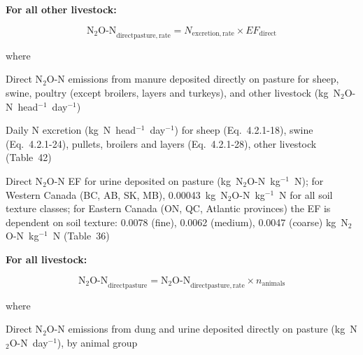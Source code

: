 \bigskip
\noindent\textbf{For all other livestock:}

\begin{equation}
    \mathrm{N_2O\text{-}N}_{\mathrm{directpasture,rate}}
        = N_{\mathrm{excretion,rate}} \times \mathit{EF}_{\mathrm{direct}}
    \tag{Eq.\ 5.3.1-2}
\end{equation}

\noindent where

\begin{description}[font=\normalfont, leftmargin=12em, style=nextline, nosep]
    \item[$\mathrm{N_2O\text{-}N}_{\mathrm{directpasture,rate}}$]
        Direct N$_2$O-N emissions from manure deposited directly on pasture for
        sheep, swine, poultry (except broilers, layers and turkeys), and other
        livestock (kg~N$_2$O-N~head$^{-1}$~day$^{-1}$)
    \item[$N_{\mathrm{excretion,rate}}$]
        Daily N excretion (kg~N~head$^{-1}$~day$^{-1}$) for sheep
        (Eq.~4.2.1-18), swine (Eq.~4.2.1-24), pullets, broilers and layers
        (Eq.~4.2.1-28), other livestock (Table~42)
    \item[$\mathit{EF}_{\mathrm{direct}}$]
        Direct N$_2$O-N EF for urine deposited on pasture
        (kg~N$_2$O-N~kg$^{-1}$~N); for Western Canada (BC, AB, SK, MB),
        0.00043~kg~N$_2$O-N~kg$^{-1}$~N for all soil texture classes; for
        Eastern Canada (ON, QC, Atlantic provinces) the EF is dependent on soil
        texture: 0.0078 (fine), 0.0062 (medium), 0.0047 (coarse)
        kg~N$_2$O-N~kg$^{-1}$~N (Table~36)
\end{description}

\bigskip
\noindent\textbf{For all livestock:}

\begin{equation}
    \mathrm{N_2O\text{-}N}_{\mathrm{directpasture}}
        = \mathrm{N_2O\text{-}N}_{\mathrm{directpasture,rate}}
          \times n_{\mathrm{animals}}
    \tag{Eq.\ 5.3.1-3}
\end{equation}

\noindent where

\begin{description}[font=\normalfont, leftmargin=12em, style=nextline, nosep]
    \item[$\mathrm{N_2O\text{-}N}_{\mathrm{directpasture}}$]
        Direct N$_2$O-N emissions from dung and urine deposited directly on
        pasture (kg~N$_2$O-N~day$^{-1}$), by animal group
\end{description}

